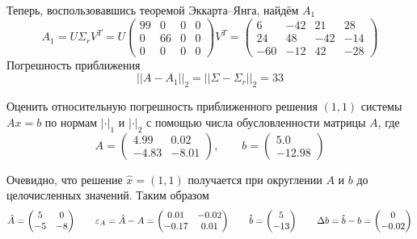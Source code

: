 Теперь, воспользовавшись теоремой Эккарта--Янга, найдём $A_1$
\begin{equation*}
    A_1 = U \Sigma_r V^T = U
    \begin{pmatrix}
        99 & 0 & 0 & 0\\
        0 & 66 & 0 & 0\\
        0 & 0 & 0 & 0
    \end{pmatrix}
    V^T =
    \begin{pmatrix}
        6 & -42 & 21 & 28\\
        24 & 48 & -42 & -14\\
        -60 & -12 & 42 & -28
    \end{pmatrix}
\end{equation*}
Погрешность приближения
\begin{equation*}
    ||A - A_1||_2 = ||\Sigma - \Sigma_r||_2 = 33
\end{equation*}


\newpage
\begin{problem}
    Оценить относительную погрешность приближенного решения $(1, 1)$ системы
    $Ax = b$ по нормам $|\cdot|_1$ и $|\cdot|_2$ с помощью числа обусловленности
    матрицы $A$, где
    \begin{equation*}
        A = \begin{pmatrix}
            4.99 & 0.02\\
            -4.83 & -8.01
        \end{pmatrix}
    ,\qquad
    b = \begin{pmatrix}
            5.0\\
            -12.98
        \end{pmatrix}
    \end{equation*}
\end{problem}


Очевидно, что решение $\hat{x} = (1, 1)$ получается при округлении $A$ и $b$ до
целочисленных значений. Таким образом
\begin{equation*}
    \hat{A} =
    \begin{pmatrix}
        5 & 0\\
        -5 & -8
    \end{pmatrix}
    \qquad
    \varepsilon_A = \hat{A} - A =
    \begin{pmatrix}
        0.01 & -0.02\\
        -0.17 & 0.01
    \end{pmatrix}
    \qquad
    \hat{b} =
    \begin{pmatrix}
        5\\
        -13
    \end{pmatrix}
    \qquad
    \Delta{b} = \hat{b} - b =
    \begin{pmatrix}
        0\\
        -0.02
    \end{pmatrix}
\end{equation*}

